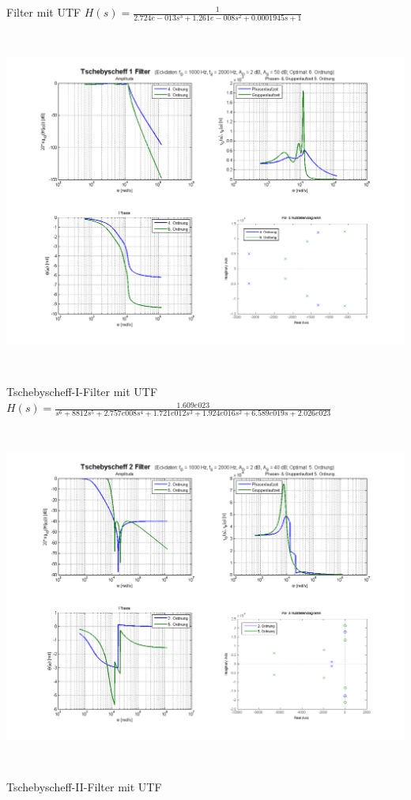 \begin{center}
Filter mit UTF $H(s) = \frac{1}{2.724e-013 s^3 + 1.261e-008 s^2 + 0.0001945 s +
1}$ 
\includegraphics[height=12cm]{./bilder/filter-tschebyscheff1.png} \\Tschebyscheff-I-Filter mit UTF $H(s)
= \frac{1.609e023}{s^6 + 8812 s^5 + 2.757e008 s^4 + 1.721e012 s^3 + 1.924e016
s^2 + 6.589e019 s + 2.026e023}$ 
\includegraphics[height=12cm]{./bilder/filter-tschebyscheff2.png} \\Tschebyscheff-II-Filter mit UTF

\end{center}
